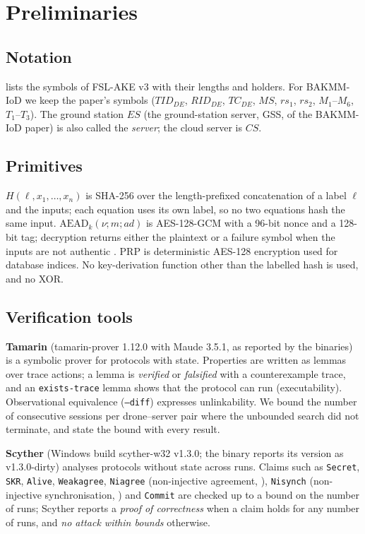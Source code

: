 \section{Preliminaries}\label{sec:prelim}

\subsection{Notation}
 lists the symbols of FSL-AKE v3 with their lengths and holders. For BAKMM-IoD we keep the paper's symbols
($TID_{DE}$, $RID_{DE}$, $TC_{DE}$, $MS$, $rs_1$, $rs_2$, $M_1$--$M_6$, $T_1$--$T_3$). The ground station $ES$ (the
ground-station server, GSS, of the BAKMM-IoD paper) is also called the \emph{server}; the cloud server is $CS$.


\subsection{Primitives}
$H(\ell, x_1,\dots,x_n)$ is SHA-256 \citep{fips1804} over the length-prefixed concatenation of a label $\ell$ and the inputs;
each equation uses its own label, so no two equations hash the same input. $\mathrm{AEAD}_k(\nu; m; ad)$ is AES-128-GCM
\citep{nist80038d} with a 96-bit nonce and a 128-bit tag; decryption returns either the plaintext or a failure symbol when the
inputs are not authentic \citep{rfc5116}. $\mathrm{PRP}$ is deterministic AES-128 encryption used for database indices. No key-derivation function other
than the labelled hash is used, and no XOR.

\subsection{Verification tools}
\textbf{Tamarin} \citep{meier2013} (tamarin-prover 1.12.0 with Maude 3.5.1, as reported by the binaries) is a
symbolic prover for protocols with state. Properties are written as lemmas over trace actions; a lemma is \emph{verified} or
\emph{falsified} with a counterexample trace, and an \texttt{exists-trace} lemma shows that the protocol can run
(executability). Observational equivalence (\texttt{--diff}) \citep{basin2015} expresses unlinkability. We bound the number of consecutive sessions per drone--server pair where the unbounded search did not
terminate, and state the bound with every result.

\textbf{Scyther} \citep{cremers2008} (Windows build scyther-w32 v1.3.0; the binary reports its version as
v1.3.0-dirty) analyses protocols without state across runs. Claims such as \texttt{Secret}, \texttt{SKR},
\texttt{Alive}, \texttt{Weakagree}, \texttt{Niagree} (non-injective agreement, \citep{lowe1997}), \texttt{Nisynch}
(non-injective synchronisation, \citep{cremers2006}) and \texttt{Commit} are checked up to a bound on the number of runs; Scyther reports a \emph{proof of correctness} when a claim holds for any number of runs, and
\emph{no attack within bounds} otherwise.

